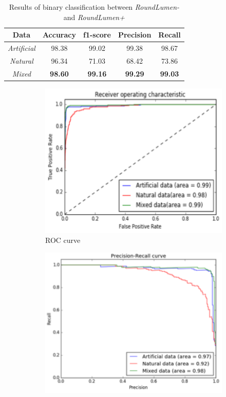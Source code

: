 \begin{table}[ht!]
\centering
\caption{Results of binary classification between \textit{RoundLumen-} and \textit{RoundLumen+}}
\begin{tabular}{ | c | c | c | c | c |} 
\hline
Data & Accuracy & f1-score & Precision & Recall \\ 
\hline
\textit{Artificial} & 98.38 & 99.02 & 99.38 & 98.67 \\ 
\hline
\textit{Natural} & 96.34& 71.03& 68.42& 73.86 \\
\hline
\textit{Mixed} & \textbf{98.60} &  \textbf{99.16} & \textbf{99.29} & \textbf{99.03} \\
\hline
\end{tabular}
\label{table:results1}
\end{table}


\begin{figure}[ht!]
    \centering
    \begin{subfigure}[t]{0.5\textwidth}
     \centering
       \includegraphics[width=1.0\linewidth]{img/roundlumens_ROC.pdf}
  \caption{ROC curve}
        \label{fig:ROC2}   
    \end{subfigure}%
    \begin{subfigure}[t]{0.5\textwidth}
       \centering
          \includegraphics[width=1.0\linewidth]{img/roundlumens_PRC.pdf}

\end{subfigure}
\end{figure}
